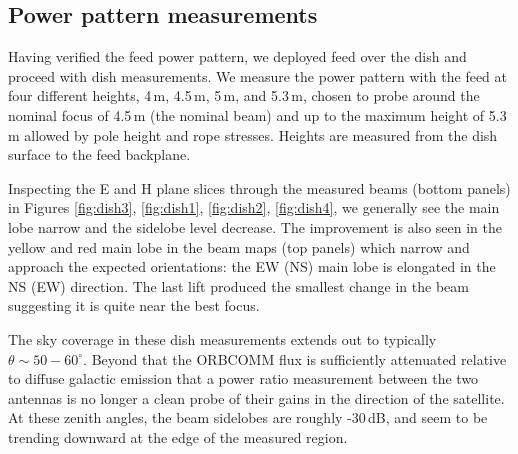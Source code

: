 \documentclass{emulateapj}
\begin{document}
\subsection{Power pattern measurements}

Having verified the feed power pattern, we deployed feed over the dish and proceed with dish measurements. We measure the power pattern with the feed at four different heights, 4\,m, 4.5\,m, 5\,m, and 5.3\,m, chosen to probe around the nominal focus of 4.5\,m (the nominal beam) and up to the maximum height of 5.3\,m allowed by pole height and rope stresses. Heights are measured from the dish surface to the feed backplane. 

Inspecting the E and H plane slices through the measured beams (bottom panels) in Figures \ref{fig:dish3}, \ref{fig:dish1}, \ref{fig:dish2}, \ref{fig:dish4}, we generally see the main lobe narrow and the sidelobe level decrease. The improvement is also seen in the yellow and red main lobe in the beam maps (top panels) which narrow and approach the expected orientations: the EW (NS) main lobe is elongated in the NS (EW) direction. The last lift produced the smallest change in the beam suggesting it is quite near the best focus. 

The sky coverage in these dish measurements extends out to typically $\theta\sim50-60^\circ$. Beyond that the ORBCOMM flux is sufficiently attenuated relative to diffuse galactic emission that a power ratio measurement between the two antennas is no longer a clean probe of their gains in the direction of the satellite. At these zenith angles, the beam sidelobes are roughly -30\,dB, and seem to be trending downward at the edge of the measured region.



\end{document}
